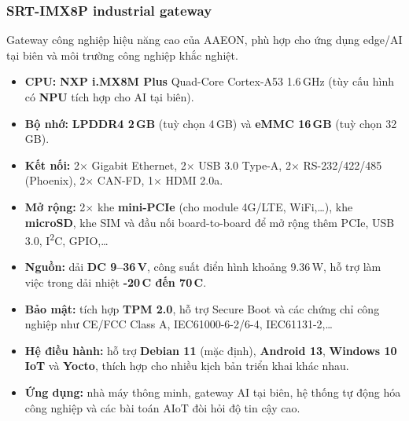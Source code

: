             \subsubsection*{SRT-IMX8P industrial gateway}
                Gateway công nghiệp hiệu năng cao của AAEON, phù hợp cho ứng dụng edge/AI tại biên và môi trường công nghiệp khắc nghiệt.
                \begin{itemize}
                    \item \textbf{CPU:} \textbf{NXP i.MX8M Plus} Quad-Core Cortex-A53 1{.}6\,GHz (tùy cấu hình có \textbf{NPU} tích hợp cho AI tại biên).
                    \item \textbf{Bộ nhớ:} \textbf{LPDDR4 2\,GB} (tuỳ chọn 4\,GB) và \textbf{eMMC 16\,GB} (tuỳ chọn 32\,GB).
                    \item \textbf{Kết nối:} 2$\times$ Gigabit Ethernet, 2$\times$ USB 3.0 Type-A, 2$\times$ RS-232/422/485 (Phoenix), 2$\times$ CAN-FD, 1$\times$ HDMI 2.0a.
                    \item \textbf{Mở rộng:} 2$\times$ khe \textbf{mini-PCIe} (cho module 4G/LTE, WiFi,\dots), khe \textbf{microSD}, khe SIM và đầu nối board-to-board để mở rộng thêm PCIe, USB 3{.}0, I\textsuperscript{2}C, GPIO,\dots
                    \item \textbf{Nguồn:} dải \textbf{DC 9--36\,V}, công suất điển hình khoảng 9{.}36\,W, hỗ trợ làm việc trong dải nhiệt \textbf{-20\,\textdegree C đến 70\,\textdegree C}.
                    \item \textbf{Bảo mật:} tích hợp \textbf{TPM 2{.}0}, hỗ trợ Secure Boot và các chứng chỉ công nghiệp như CE/FCC Class A, IEC61000-6-2/6-4, IEC61131-2,\dots
                    \item \textbf{Hệ điều hành:} hỗ trợ \textbf{Debian 11} (mặc định), \textbf{Android 13}, \textbf{Windows 10 IoT} và \textbf{Yocto}, thích hợp cho nhiều kịch bản triển khai khác nhau.
                    \item \textbf{Ứng dụng:} nhà máy thông minh, gateway AI tại biên, hệ thống tự động hóa công nghiệp và các bài toán AIoT đòi hỏi độ tin cậy cao.
                \end{itemize}
